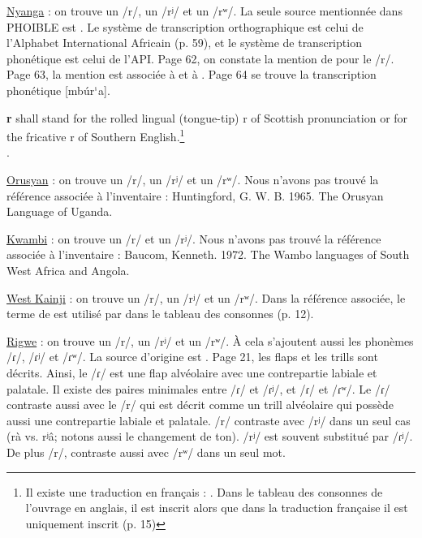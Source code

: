 \begin{exe}
	\ex \begin{xlist}		
	\ex \href{https://phoible.org/inventories/view/1365}{Nyanga}  : on trouve un /r/, un /rʲ/ et un /rʷ/. La seule source mentionnée dans PHOIBLE est \textcite{kadimaEsquissePhonologiqueMorphologique1965}. Le système de transcription orthographique est celui de l'Alphabet International Africain (p. 59), et le système de transcription phonétique est celui de l'API. Page 62, on constate la mention de  pour le /r/. Page 63, la mention  est associée à  et à . Page 64 se trouve la transcription phonétique [mbúr$^\textrm{\tiny i}$a].
	
	\begin{displayquote}
		\item \textbf{r} shall stand for the rolled lingual (tongue-tip) r of Scottish pronunciation or for the fricative r of Southern English.\footnote{Il existe une traduction en français : . Dans le tableau des consonnes de l'ouvrage en anglais, il est inscrit  alors que dans la traduction française il est uniquement inscrit  (p. 15)}\\ \parencite[9]{internationalafricaninstitutePracticalOrthographyAfrican1930}.
	\end{displayquote}

	\ex \href{https://phoible.org/inventories/view/1367}{Orusyan}  : on trouve un /r/, un /rʲ/ et un /rʷ/. Nous n'avons pas trouvé la référence associée à l'inventaire : Huntingford, G. W. B. 1965. The Orusyan Language of Uganda.
	
	\ex \href{https://phoible.org/inventories/view/1503}{Kwambi}  : on trouve un /r/ et un /rʲ/. Nous n'avons pas trouvé la référence associée à l'inventaire : Baucom, Kenneth. 1972. The Wambo languages of South West Africa and Angola.
	
	\ex \href{https://phoible.org/inventories/view/1535}{West Kainji}  : on trouve un /r/, un /rʲ/ et un /rʷ/. Dans la référence associée, le terme de  est utilisé par  \textcite{smithNounClassSystem2007} dans le tableau des consonnes (p. 12).
	
	\ex \href{https://phoible.org/inventories/view/1537}{Rigwe}  : on trouve un /r/, un /rʲ/ et un /rʷ/. À cela s'ajoutent aussi les phonèmes /ɾ/, /ɾʲ/ et /ɾʷ/. La source d'origine est \textcite{danielPhonologyRigweLanguage2008}.
	Page 21, les flaps et les trills sont décrits. Ainsi, le /ɾ/ est une flap alvéolaire avec une contrepartie labiale et palatale. Il existe des paires minimales entre /ɾ/ et /ɾʲ/, et /ɾ/ et /ɾʷ/. Le /ɾ/ contraste aussi avec le /r/ qui est décrit comme un trill alvéolaire qui possède aussi une contrepartie labiale et palatale.  /r/ contraste avec /rʲ/ dans un seul cas (rà vs. rʲâ; notons aussi le changement de ton). /rʲ/ est souvent substitué par /ɾʲ/. De plus /r/, contraste aussi avec /rʷ/ dans un seul mot.
	

\end{xlist}
\end{exe}
